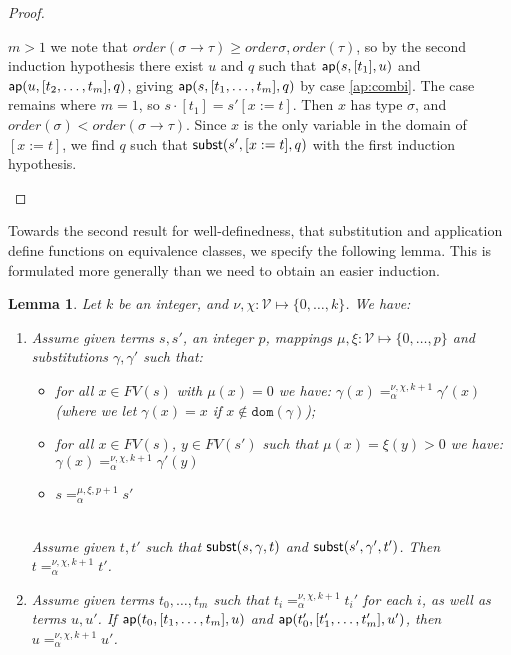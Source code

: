 \documentclass{lmcs}
\theoremstyle{theorem}\newtheorem{theorem}[dummy]{Theorem}
\theoremstyle{theorem}\newtheorem{lemma}[dummy]{Lemma}
\theoremstyle{theorem}\newtheorem{corollary}[dummy]{Corollary}
\theoremstyle{definition}\newtheorem{definition}[dummy]{Definition}
\theoremstyle{definition}\newtheorem{example}[dummy]{Example}
\newcommand{\V}{\mathcal{V}}
\newcommand{\FV}{\mathit{FV}}
\newcommand{\domain}{\mathtt{dom}}
\newcommand{\order}{\mathit{order}}
\newcommand{\atype}{\sigma}
\newcommand{\btype}{\tau}
\newcommand{\avar}{x}
\newcommand{\arrtype}{\rightarrow}
\begin{document}
\begin{proof}
\begin{itemize}
  $m > 1$ we note that $\order(\atype \arrtype \btype) \geq \order{\atype},\order(\btype)$, so by
  the second induction hypothesis there exist $u$ and $q$ such that $\mathsf{ap}(s, [t_1], u)$ and
  $\mathsf{ap}(u, [t_2,\dots,t_m], q)$, giving $\mathsf{ap}(s, [t_1,\dots,t_m], q)$ by case \ref{ap:combi}.
  The case remains where $m = 1$, so $s \cdot [t_1] = s'[\avar:=t]$.
  Then $\avar$ has type $\atype$, and $\order(\atype) < \order(\atype \arrtype \btype)$.
  Since $\avar$ is the only variable in the domain of $[\avar:=t]$, we find $q$ such that
    $\mathsf{subst}(s',[x:=t],q)$ with the first induction hypothesis.
  \qedhere
\end{itemize}
\end{proof}

Towards the second result for well-definedness, that substitution and application define functions
on equivalence classes, we specify the following lemma.  This is formulated more generally than we
need to obtain an easier induction.

\begin{lemma}\label{lem:substitutionalpha}
Let $k$ be an integer, and $\nu,\chi : \V \mapsto \{0,\dots,k\}$.  We have:
\begin{enumerate}
\item\label{lem:substitutionalpha:subst}
  Assume given terms $s,s'$, an integer $p$, mappings $\mu,\xi : \V \mapsto \{0,\dots,p\}$ and substitutions $\gamma,\gamma'$ such that:
  \begin{itemize}
  \item for all $x \in \FV(s)$ with $\mu(x) = 0$ we have:
    $\gamma(x) =_\alpha^{\nu,\chi,k+1} \gamma'(x)$ \\
    (where we let $\gamma(x) = x$ if $x \notin \domain(\gamma)$);
  \item for all $x \in \FV(s)$, $y \in \FV(s')$ such that $\mu(x) = \xi(y) > 0$ we have:
    $\gamma(x) =_\alpha^{\nu,\chi,k+1} \gamma'(y)$
  \item $s =_\alpha^{\mu,\xi,p+1} s'$
  \end{itemize}
  \ \\
  Assume given $t,t'$ such that $\mathsf{subst}(s,\gamma,t)$ and $\mathsf{subst}(s',\gamma',t')$.  Then $t =_\alpha^{\nu,\chi,k+1} t'$.
\item\label{lem:substitutionalpha:appl}
  Assume given terms $t_0,\dots,t_m$ such that $t_i =_\alpha^{\nu,\chi,k+1} t_i'$ for each $i$, as well as terms $u,u'$.
  If $\mathsf{ap}(t_0, [t_1,\dots,t_m], u)$ and $\mathsf{ap}(t_0', [t_1',\dots,t_m'], u')$, then $u =_\alpha^{\nu,\chi,k+1} u'$.
\end{enumerate}
\end{lemma}
\end{document}

